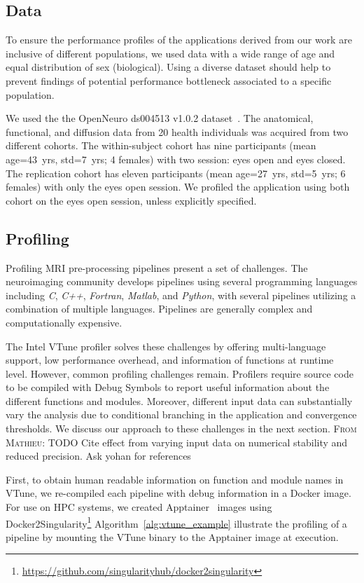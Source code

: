 \documentclass[conference]{IEEEtran}
\renewcommand{\lstlistingname}{Algorithm}
\newcommand{\MD}[1]{\color{magenta}\textsc{From Mathieu: }#1\color{black}}
\begin{document}
\subsection{Data}
To ensure the performance profiles of the applications derived from our work are inclusive of different populations, we used data with a wide range of age and equal distribution of sex (biological). Using a diverse dataset should help to prevent findings of potential performance bottleneck associated to a specific population.

We used the the OpenNeuro ds004513 v1.0.2 dataset~\cite{ds004513:1.0.2}. The anatomical, functional, and diffusion data from 20 health individuals was acquired from two different cohorts. The within-subject cohort has nine participants (mean age=43~yrs, std=7~yrs; 4 females) with two session: eyes open and eyes closed. The replication cohort has eleven participants (mean age=27~yrs, std=5~yrs; 6 females) with only the eyes open session. We profiled the application using both cohort on the eyes open session, unless explicitly specified.

\subsection{Profiling}
Profiling MRI pre-processing pipelines present a set of challenges. The neuroimaging community develops pipelines using several programming languages including \textit{C}, \textit{C++}, \textit{Fortran}, \textit{Matlab}, and \textit{Python}, with several pipelines utilizing a combination of multiple languages. Pipelines are generally complex and computationally expensive.

The Intel VTune profiler solves these challenges by offering multi-language support, low performance overhead, and information of functions at runtime level. However, common profiling challenges remain. Profilers require source code to be compiled with Debug Symbols to report useful information about the different functions and modules. Moreover, different input data can substantially vary the analysis due to conditional branching in the application and convergence thresholds. We discuss our approach to these challenges in the next section.
\MD{TODO Cite effect from varying input data on numerical stability and reduced precision. Ask yohan for references}
		
First, to obtain human readable information on function and module names in VTune, we re-compiled each pipeline with debug information in a Docker image. For use on HPC systems, we created Apptainer~\cite{Kurtzer2017-bu} images using Docker2Singularity\footnote{\href{https://github.com/singularityhub/docker2singularity}{https://github.com/singularityhub/docker2singularity}} \lstlistingname~\ref{alg:vtune_example} illustrate the profiling of a pipeline by mounting the VTune binary to the Apptainer image at execution.
\end{document}
